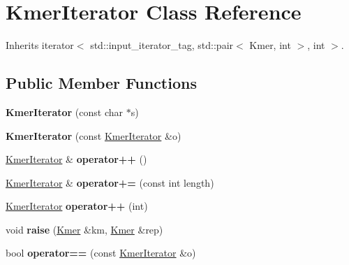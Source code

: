 \hypertarget{classKmerIterator}{}\section{Kmer\+Iterator Class Reference}
\label{classKmerIterator}


Inherits iterator$<$ std\+::input\+\_\+iterator\+\_\+tag, std\+::pair$<$ Kmer, int $>$, int $>$.

\subsection*{Public Member Functions}
\begin{DoxyCompactItemize}
\item 
\mbox{\label{classKmerIterator_a476e371728779a11d2d92e5e87bbff78}} 
{\bfseries Kmer\+Iterator} (const char $\ast$s)
\item 
\mbox{\label{classKmerIterator_af4644086e4d65bec6ce34692c9c8e911}} 
{\bfseries Kmer\+Iterator} (const \hyperlink{classKmerIterator}{Kmer\+Iterator} \&o)
\item 
\mbox{\label{classKmerIterator_a00adeaf50bde52d80100a3daeb8cc43c}} 
\hyperlink{classKmerIterator}{Kmer\+Iterator} \& {\bfseries operator++} ()
\item 
\mbox{\label{classKmerIterator_a7e49376df50ce022233efb7f04c06a5d}} 
\hyperlink{classKmerIterator}{Kmer\+Iterator} \& {\bfseries operator+=} (const int length)
\item 
\mbox{\label{classKmerIterator_a71544ba53be0625065ac8e57447b3d92}} 
\hyperlink{classKmerIterator}{Kmer\+Iterator} {\bfseries operator++} (int)
\item 
\mbox{\label{classKmerIterator_a2251816e776ef1ac13b74e09c52f434c}} 
void {\bfseries raise} (\hyperlink{classKmer}{Kmer} \&km, \hyperlink{classKmer}{Kmer} \&rep)
\item 
\mbox{\label{classKmerIterator_a6fcb9a486e4c60eaa5a544d9d4bf1fc2}} 
bool {\bfseries operator==} (const \hyperlink{classKmerIterator}{Kmer\+Iterator} \&o)
\item 

\end{DoxyCompactItemize}
